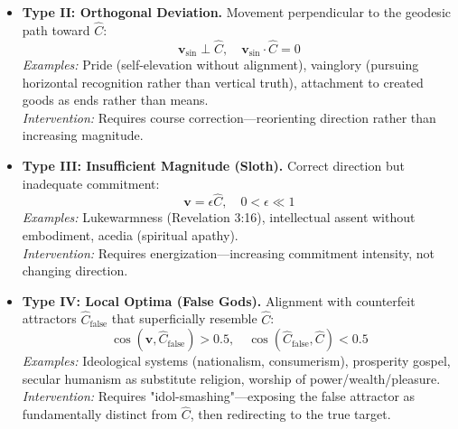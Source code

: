 \documentclass[11pt,a4paper]{article}
\theoremstyle{definition}
\theoremstyle{remark}
\begin{document}
\begin{small}
\begin{itemize}
    \item \textbf{Type II: Orthogonal Deviation.} Movement perpendicular to the geodesic path toward \(\hat{C}\):
    \begin{equation}
        \mathbf{v}_{\text{sin}} \perp \hat{C}, \quad \mathbf{v}_{\text{sin}} \cdot \hat{C} = 0
    \end{equation}
    \textit{Examples:} Pride (self-elevation without alignment), vainglory (pursuing horizontal recognition rather than vertical truth), attachment to created goods as ends rather than means.\\
    \textit{Intervention:} Requires course correction—reorienting direction rather than increasing magnitude.
    
    \item \textbf{Type III: Insufficient Magnitude (Sloth).} Correct direction but inadequate commitment:
    \begin{equation}
        \mathbf{v} = \epsilon \hat{C}, \quad 0 < \epsilon \ll 1
    \end{equation}
    \textit{Examples:} Lukewarmness (Revelation 3:16), intellectual assent without embodiment, acedia (spiritual apathy).\\
    \textit{Intervention:} Requires energization—increasing commitment intensity, not changing direction.
    
    \item \textbf{Type IV: Local Optima (False Gods).} Alignment with counterfeit attractors \(\hat{C}_{\text{false}}\) that superficially resemble \(\hat{C}\):
    \begin{equation}
        \cos(\mathbf{v}, \hat{C}_{\text{false}}) > 0.5, \quad \cos(\hat{C}_{\text{false}}, \hat{C}) < 0.5
    \end{equation}
    \textit{Examples:} Ideological systems (nationalism, consumerism), prosperity gospel, secular humanism as substitute religion, worship of power/wealth/pleasure.\\
    \textit{Intervention:} Requires "idol-smashing"—exposing the false attractor as fundamentally distinct from \(\hat{C}\), then redirecting to the true target.
\end{itemize}

\begin{figure}[h!]
    \centering
\end{figure}
\end{small}
\end{document}
